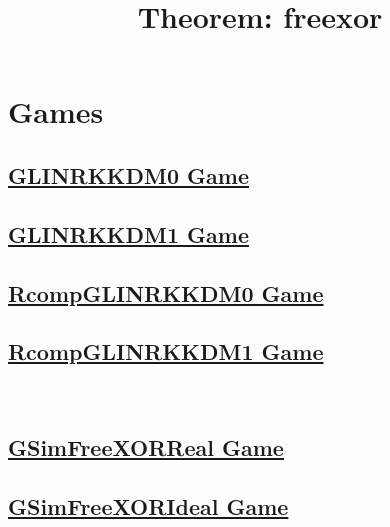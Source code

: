 \documentclass[a3paper]{article}
\title{Theorem: freexor}
\theoremstyle{definition}
\begin{document}
\maketitle
\tableofcontents
\clearpage
\section{Games}
\begin{minipage}{.245\textwidth}
\subsection*{\hyperref[section:game:GLINRKKDM0]{GLINRKKDM0 Game}}
\scalebox{0.66}{}
\end{minipage}
\begin{minipage}{.245\textwidth}
\subsection*{\hyperref[section:game:GLINRKKDM1]{GLINRKKDM1 Game}}
\scalebox{0.66}{}
\end{minipage}
\begin{minipage}{.245\textwidth}
\subsection*{\hyperref[section:game:RcompGLINRKKDM0]{RcompGLINRKKDM0 Game}}
\scalebox{0.66}{}
\end{minipage}
\begin{minipage}{.245\textwidth}
\subsection*{\hyperref[section:game:RcompGLINRKKDM1]{RcompGLINRKKDM1 Game}}
\scalebox{0.66}{}
\end{minipage}
\\
\begin{minipage}{.245\textwidth}
\subsection*{\hyperref[section:game:GSimFreeXORReal]{GSimFreeXORReal Game}}
\scalebox{0.66}{}
\end{minipage}
\begin{minipage}{.245\textwidth}
\subsection*{\hyperref[section:game:GSimFreeXORIdeal]{GSimFreeXORIdeal Game}}
\scalebox{0.66}{}
\end{minipage}
\clearpage
\end{document}
